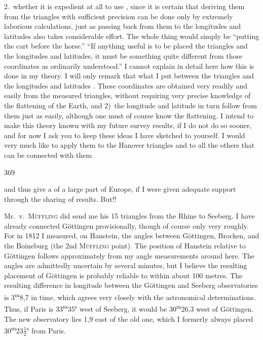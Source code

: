 \par\noindent\hspace*{\parindent}2.\ whether it is expedient at all to use , since it is certain that deriving them from the triangles with sufficient precision can be done only by extremely laborious calculations, just as passing back from them to the longitudes and latitudes also takes considerable effort.
The whole thing would simply be “putting the cart before the horse.”
“If anything useful is to be placed  the triangles and the longitudes and latitudes, it must be something quite different from those coordinates as ordinarily understood.”
I cannot explain in detail here how this is done in my theory. I will only remark that what I put between the triangles and the longitudes and latitudes .
These coordinates are obtained very readily and easily from the measured triangles, without requiring very precise knowledge of the flattening of the Earth, and 2)~the longitude and latitude in turn follow from them just as easily, although one must of course know the flattening.
I intend to make this theory known with my future survey results, if I do not do so sooner, and for now I ask you to keep these ideas I have sketched to yourself.
I would very much like to apply them to the Hanover triangles and to all the others that can be connected with them
\par\clearpage
{}\hfill369\par\medskip
\noindent and thus give a  of a large part of Europe, if I were given adequate support through the sharing of results.
But!!

\par\noindent\hspace*{\parindent}Mr.~v.\ \textsc{Müffling} did send me his 15 triangles from the Rhine to Seeberg.
I have already connected Göttingen provisionally, though of course only very roughly.
For in 1812 I measured, on Hanstein, the angles between Göttingen, Brocken, and the Boineburg (the 2nd \textsc{Müffling} point). The position of Hanstein relative to Göttingen follows approximately from my angle measurements around here. The angles are admittedly uncertain by several minutes, but I believe the resulting placement of Göttingen is probably reliable to within about 100 metres.
The resulting difference in longitude between the Göttingen and Seeberg observatories is \mbox{3\textsuperscript{m}8,7} in time, which agrees very closely with the astronomical determinations.
Thus, if Paris is \mbox{33\textsuperscript{m}35\textsuperscript{s}} west of Seeberg, it would be \mbox{30\textsuperscript{m}26,3} west of Göttingen.
The new observatory lies \mbox{1,9} east of the old one, which I formerly always placed \mbox{30\textsuperscript{m}23\(\tfrac{1}{2}\)\textsuperscript{s}} from Paris.
